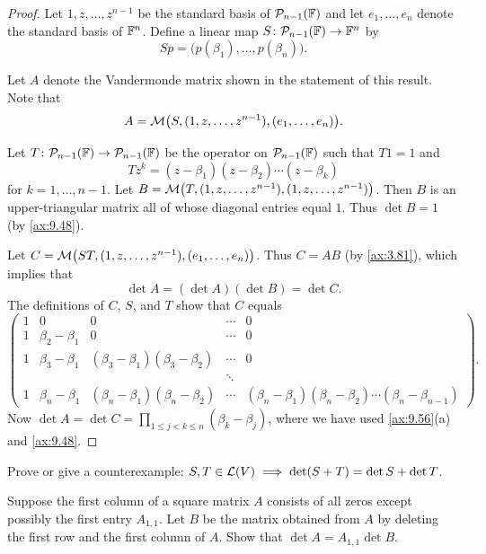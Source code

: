 \begin{proof}
Let $1,z,\dots,z^{n-1}$ be the standard basis of $\mathcal{P}_{n-1}(\mathbb{F})$ and let
$e_1,\dots,e_n$ denote the standard basis of $\mathbb{F}^n$. Define a linear map
$S\colon\mathcal{P}_{n-1}(\mathbb{F})\to\mathbb{F}^n$ by
\[ Sp = \bigl(p(\beta_1),\dots,p(\beta_n)\bigr). \]

Let $A$ denote the Vandermonde matrix shown in the statement of this result.
Note that
\[ A = \mathcal{M}\bigl(S,(1,z,\dots,z^{n-1}),(e_1,\dots,e_n)\bigr). \]

Let $T\colon\mathcal{P}_{n-1}(\mathbb{F})\to\mathcal{P}_{n-1}(\mathbb{F})$ be the operator on
$\mathcal{P}_{n-1}(\mathbb{F})$ such that $T1=1$ and
\[ Tz^k = (z-\beta_1)(z-\beta_2)\cdots(z-\beta_k) \]
for $k=1,\dots,n-1$. Let
$B=\mathcal{M}\bigl(T,(1,z,\dots,z^{n-1}),(1,z,\dots,z^{n-1})\bigr)$. Then $B$ is an
upper-triangular matrix all of whose diagonal entries equal $1$. Thus
$\det B=1$ (by \ref{ax:9.48}).

Let $C=\mathcal{M}\bigl(ST,(1,z,\dots,z^{n-1}),(e_1,\dots,e_n)\bigr)$. Thus $C=AB$
(by \ref{ax:3.81}), which implies that
\[ \det A = (\det A)(\det B) = \det C. \]
The definitions of $C$, $S$, and $T$ show that $C$ equals
\[ \begin{pmatrix}
   1 & 0 & 0 & \cdots & 0\\
   1 & \beta_2-\beta_1 & 0 & \cdots & 0\\
   1 & \beta_3-\beta_1 & (\beta_3-\beta_1)(\beta_3-\beta_2) & \cdots & 0\\
     &  &  & \ddots & \\
   1 & \beta_n-\beta_1 & (\beta_n-\beta_1)(\beta_n-\beta_2) & \cdots
     & (\beta_n-\beta_1)(\beta_n-\beta_2)\cdots(\beta_n-\beta_{n-1})
   \end{pmatrix}. \]
Now $\det A=\det C=\displaystyle\prod_{1\le j<k\le n}(\beta_k-\beta_j)$, where
we have used \ref{ax:9.56}(a) and \ref{ax:9.48}.
\end{proof}


\begin{exercise}
Prove or give a counterexample: $S,T\in\mathcal{L}(V)\implies
\operatorname{det}(S+T)=\operatorname{det} S+\operatorname{det} T$.
\end{exercise}

\begin{exercise}
Suppose the first column of a square matrix $A$ consists of all zeros except
possibly the first entry $A_{1,1}$. Let $B$ be the matrix obtained from $A$ by
deleting the first row and the first column of $A$. Show that
$\det A=A_{1,1}\det B$.
\end{exercise}

